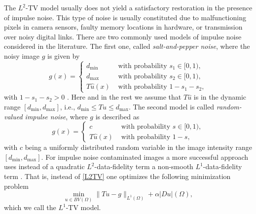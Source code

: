\documentclass[enabledeprecatedfontcommands,cleardoublepage=empty,headsepline,twoside,11pt,DIV=15,BCOR=12mm,final]{scrartcl}
\begin{document}
The $L^2$-TV model usually does not yield a satisfactory restoration in the presence of impulse noise. This type of noise is usually constituted due to malfunctioning pixels in camera sensors, faulty memory locations in hardware, or transmission over noisy digital links. There are two commonly used models of impulse noise considered in the literature. The first one, called \emph{salt-and-pepper noise}, where the noisy image $g$ is given by
$$
g(x) = 
\begin{cases}
d_{\min} & \text{ with probability } s_1\in [0,1),\\
d_{\max} & \text{ with probability } s_2\in [0,1),\\
T \hat{u}(x)  & \text{ with probability } 1-s_1-s_2,
\end{cases}
$$
with $1-s_1-s_2>0$ \cite{ChaHoNik}. Here and in the rest we assume that $T \hat{u}$ is in the dynamic range $[d_{\min},d_{\max}]$, i.e., $d_{\min}\leq T\hat{u}\leq d_{\max}$. The second model is called \emph{random-valued impulse noise}, where $g$ is described as
$$
g(x) = 
\begin{cases}
c & \text{ with probability } s\in [0,1),\\
T \hat{u}(x)  & \text{ with probability } 1-s,
\end{cases}
$$
with $c$ being a uniformly distributed random variable in the image intensity range $[d_{\min},d_{\max}]$. For impulse noise contaminated images a more successful approach uses instead of a quadratic $L^2$-data-fidelity term a non-smooth $L^1$-data-fidelity term \cite{All, Nik2002, Nik2004}. That is, instead of \eqref{L2TV} one optimizes the following minimization problem
\begin{equation}\label{L1TV}
\min_{u\in BV(\Omega)} \|Tu-g\|_{L^1(\Omega)} + \alpha |Du|(\Omega),
\end{equation}
which we call the $L^1$-TV model. 
\end{document}
